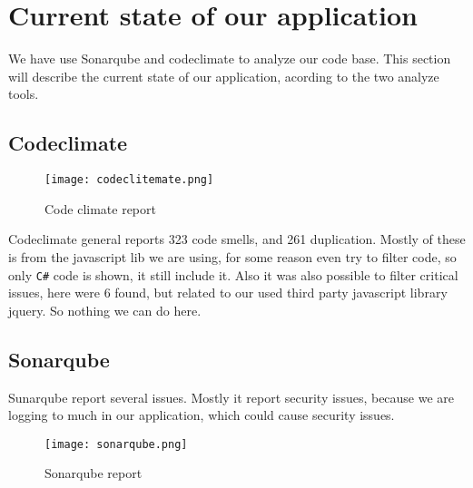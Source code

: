 \section{Current state of our application}

We have use Sonarqube and codeclimate to analyze our code base. This section will describe the current state of our application, acording to the two analyze tools. 

\subsection*{Codeclimate}

\begin{figure}[H]
	\centering
	\texttt{[image: codeclitemate.png]}
	\caption{Code climate report}
	\label{fig:Code climate}
\end{figure}

Codeclimate general reports 323 code smells, and 261 duplication. Mostly of these is from the javascript lib we are using, for some reason even try to filter code, so only \texttt{C\#} code is shown, it still include it. Also it was also possible to filter critical issues, here were 6 found, but related to our used third party javascript library jquery. So nothing we can do here. 

\subsection*{Sonarqube}
Sunarqube report several issues. Mostly it report security issues, because we are logging to much in our application, which could cause security issues. 
\begin{figure}[H]
	\centering
	\texttt{[image: sonarqube.png]}
	\caption{Sonarqube report}
	\label{fig:Sonarqube}
\end{figure}